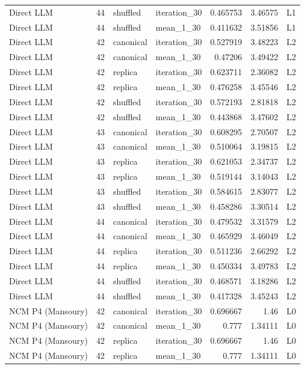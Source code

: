 \begin{table}[htbp!]
\begin{tabular}{lrllrrl}
Direct LLM & 44 & shuffled & iteration\_30 & 0.465753 & 3.46575 & L1 \\
Direct LLM & 44 & shuffled & mean\_1\_30 & 0.411632 & 3.51856 & L1 \\
Direct LLM & 42 & canonical & iteration\_30 & 0.527919 & 3.48223 & L2 \\
Direct LLM & 42 & canonical & mean\_1\_30 & 0.47206 & 3.49422 & L2 \\
Direct LLM & 42 & replica & iteration\_30 & 0.623711 & 2.36082 & L2 \\
Direct LLM & 42 & replica & mean\_1\_30 & 0.476258 & 3.45546 & L2 \\
Direct LLM & 42 & shuffled & iteration\_30 & 0.572193 & 2.81818 & L2 \\
Direct LLM & 42 & shuffled & mean\_1\_30 & 0.443868 & 3.47602 & L2 \\
Direct LLM & 43 & canonical & iteration\_30 & 0.608295 & 2.70507 & L2 \\
Direct LLM & 43 & canonical & mean\_1\_30 & 0.510064 & 3.19815 & L2 \\
Direct LLM & 43 & replica & iteration\_30 & 0.621053 & 2.34737 & L2 \\
Direct LLM & 43 & replica & mean\_1\_30 & 0.519144 & 3.14043 & L2 \\
Direct LLM & 43 & shuffled & iteration\_30 & 0.584615 & 2.83077 & L2 \\
Direct LLM & 43 & shuffled & mean\_1\_30 & 0.458286 & 3.30514 & L2 \\
Direct LLM & 44 & canonical & iteration\_30 & 0.479532 & 3.31579 & L2 \\
Direct LLM & 44 & canonical & mean\_1\_30 & 0.465929 & 3.46049 & L2 \\
Direct LLM & 44 & replica & iteration\_30 & 0.511236 & 2.66292 & L2 \\
Direct LLM & 44 & replica & mean\_1\_30 & 0.450334 & 3.49783 & L2 \\
Direct LLM & 44 & shuffled & iteration\_30 & 0.468571 & 3.18286 & L2 \\
Direct LLM & 44 & shuffled & mean\_1\_30 & 0.417328 & 3.45243 & L2 \\
NCM P4 (Mansoury) & 42 & canonical & iteration\_30 & 0.696667 & 1.46 & L0 \\
NCM P4 (Mansoury) & 42 & canonical & mean\_1\_30 & 0.777 & 1.34111 & L0 \\
NCM P4 (Mansoury) & 42 & replica & iteration\_30 & 0.696667 & 1.46 & L0 \\
NCM P4 (Mansoury) & 42 & replica & mean\_1\_30 & 0.777 & 1.34111 & L0 \\

\end{tabular}
\end{table}
